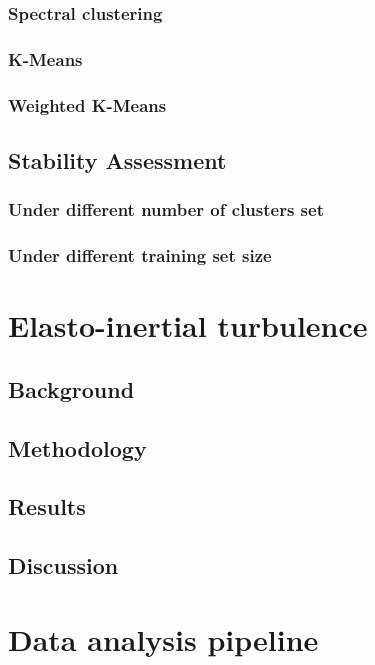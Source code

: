 \documentclass[12pt]{report} %
\begin{document}
\subsection{Spectral clustering}

\subsection{K-Means}

\subsection{Weighted K-Means}

\section{Stability Assessment}

\subsection{Under different number of clusters set}

\subsection{Under different training set size}

\chapter{Elasto-inertial turbulence}

\section{Background}

\section{Methodology}

\section{Results}

\section{Discussion}

\chapter{Data analysis pipeline}




\end{document}
